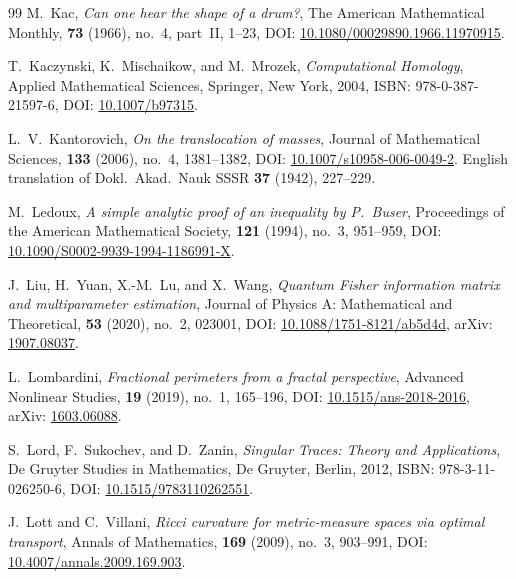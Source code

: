 \documentclass[11pt,a4paper,reqno]{amsart}
\theoremstyle{definition}
\numberwithin{equation}{section}
\begin{document}
\begin{thebibliography}{99}
M.~Kac,
\emph{Can one hear the shape of a drum?},
The American Mathematical Monthly, \textbf{73} (1966), no.~4, part~II, 1--23, DOI: \href{https://doi.org/10.1080/00029890.1966.11970915}{10.1080/00029890.1966.11970915}.

T.~Kaczynski, K.~Mischaikow, and M.~Mrozek,
\emph{Computational Homology},
Applied Mathematical Sciences, Springer, New York, 2004, ISBN: 978-0-387-21597-6, DOI: \href{https://doi.org/10.1007/b97315}{10.1007/b97315}.

L.~V.~Kantorovich,
\emph{On the translocation of masses},
Journal of Mathematical Sciences, \textbf{133} (2006), no.~4, 1381--1382, DOI: \href{https://doi.org/10.1007/s10958-006-0049-2}{10.1007/s10958-006-0049-2}. English translation of Dokl.\ Akad.\ Nauk SSSR \textbf{37} (1942), 227--229.

M.~Ledoux,
\emph{A simple analytic proof of an inequality by P.~Buser},
Proceedings of the American Mathematical Society, \textbf{121} (1994), no.~3, 951--959, DOI: \href{https://doi.org/10.1090/S0002-9939-1994-1186991-X}{10.1090/S0002-9939-1994-1186991-X}.

J.~Liu, H.~Yuan, X.-M.~Lu, and X.~Wang,
\emph{Quantum Fisher information matrix and multiparameter estimation},
Journal of Physics A: Mathematical and Theoretical, \textbf{53} (2020), no.~2, 023001, DOI: \href{https://doi.org/10.1088/1751-8121/ab5d4d}{10.1088/1751-8121/ab5d4d}, arXiv: \href{https://arxiv.org/abs/1907.08037}{1907.08037}.

L.~Lombardini,
\emph{Fractional perimeters from a fractal perspective},
Advanced Nonlinear Studies, \textbf{19} (2019), no.~1, 165--196, DOI: \href{https://doi.org/10.1515/ans-2018-2016}{10.1515/ans-2018-2016}, arXiv: \href{https://arxiv.org/abs/1603.06088}{1603.06088}.

S.~Lord, F.~Sukochev, and D.~Zanin,
\emph{Singular Traces: Theory and Applications},
De Gruyter Studies in Mathematics, De Gruyter, Berlin, 2012, ISBN: 978-3-11-026250-6, DOI: \href{https://doi.org/10.1515/9783110262551}{10.1515/9783110262551}.

J.~Lott and C.~Villani,
\emph{Ricci curvature for metric-measure spaces via optimal transport},
Annals of Mathematics, \textbf{169} (2009), no.~3, 903--991, DOI: \href{https://doi.org/10.4007/annals.2009.169.903}{10.4007/annals.2009.169.903}.


\end{thebibliography}
\end{document}
